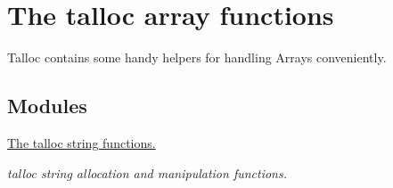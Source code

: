 \hypertarget{group__talloc__array}{}\section{The talloc array functions}
\label{group__talloc__array}


Talloc contains some handy helpers for handling Arrays conveniently.  


\subsection*{Modules}
\begin{DoxyCompactItemize}
\item 
\hyperlink{group__talloc__string}{The talloc string functions.}
\begin{DoxyCompactList}\small\item\em talloc string allocation and manipulation functions. \end{DoxyCompactList}\end{DoxyCompactItemize}

